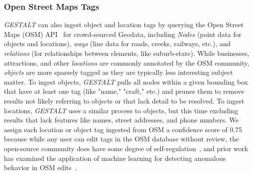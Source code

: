 \subsubsection{Open Street Maps Tags}
\emph{GESTALT} can also ingest object and location tags by querying the Open Street Maps (OSM) API~\cite{Haklay2008}
for crowd-sourced Geodata, including \textit{Nodes} (point data for objects and locations), \textit{ways} (line data for roads, creeks, railways, etc.), and \textit{relations} (for relationships between elements, like suburb-state).
While businesses, attractions, and other \textit{locations} are commonly annotated by the OSM community, \textit{objects} are more sparsely tagged as they are typically less interesting subject matter. 
To ingest objects, \emph{GESTALT} pulls all nodes within a given bounding box that have at least one tag (like "name," "craft," etc.) and prunes them to remove results not likely referring to objects or that lack detail to be resolved.
To ingest locations, \emph{GESTALT} uses a similar process to objects, but this time excluding results that lack features like names, street addresses, and phone numbers. 
We assign each location or object tag ingested from OSM a confidence score of 0.75 because while any user can edit tags in the OSM database without review, the open-source community does have some degree of self-regulation~\cite{VargasMunoz2020}, and prior work has examined the application of machine learning for detecting anomalous behavior in OSM edits~\cite{Mooney2017}.

